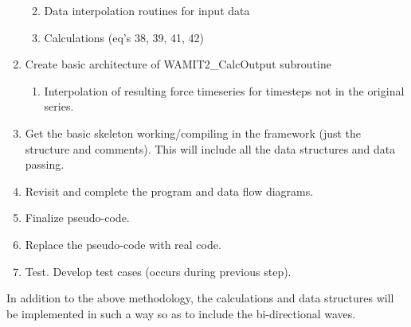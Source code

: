 \begin{enumerate}
\begin{enumerate}
\begin{enumerate}
            \end{enumerate}
         \item{Data interpolation routines for input data}
         \item{Calculations (eq's 38, 39, 41, 42)}
      \end{enumerate}
   \item{Create basic architecture of WAMIT2\_CalcOutput subroutine}
      \begin{enumerate}
         \item{Interpolation of resulting force timeseries for timesteps not in the original series.}
      \end{enumerate}
   \item{Get the basic skeleton working/compiling in the framework (just the structure and comments). This will include all the data structures and data passing.}
   \item{Revisit and complete the program and data flow diagrams.}
   \item{Finalize pseudo-code.}
   \item{Replace the pseudo-code with real code.}
   \item{Test. Develop test cases (occurs during previous step).}
\end{enumerate}

In addition to the above methodology, the calculations and data structures will be implemented in such a way so as to include the bi-directional waves.


